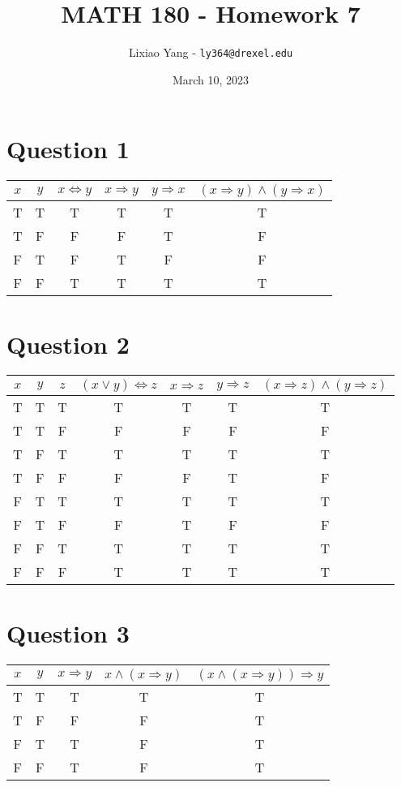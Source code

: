 \documentclass[11pt, oneside]{article}   	%
\title{\bf MATH 180 - Homework 7}
\author{Lixiao Yang - \texttt{ly364@drexel.edu}}
\date{March 10, 2023}							%
\begin{document}
\maketitle

\section*{Question 1}

	\begin{tabular}{cccccc}
	 \hline
	 $x$ & $y$ & $x\Leftrightarrow y$ & $x\Rightarrow y$ & $y\Rightarrow x$ & $(x\Rightarrow y)\wedge (y\Rightarrow x)$  \\
	 \hline
	 T & T & T & T & T & T \\
	 T & F & F & F & T & F \\
	 F & T & F & T & F & F \\
	 F & F & T & T & T & T \\
	 \hline
	\end{tabular}

\section*{Question 2}

	\begin{tabular}{ccccccc}
	 \hline
	 $x$ & $y$ & $z$ & $(x\vee y)\Leftrightarrow z$ & $x\Rightarrow z$ & $y\Rightarrow z$ & $(x\Rightarrow z)\wedge (y\Rightarrow z)$  \\
	 \hline
	 T & T & T & T & T & T & T \\
	 T & T & F & F & F & F & F \\
	 T & F & T & T & T & T & T \\
	 T & F & F & F & F & T & F \\
	 F & T & T & T & T & T & T \\
	 F & T & F & F & T & F & F \\
	 F & F & T & T & T & T & T \\
	 F & F & F & T & T & T & T \\
	 \hline
	\end{tabular}

\section*{Question 3}

\begin{tabular}{ccccc}
	\hline
	$x$ & $y$ & $x\Rightarrow y$ & $x\wedge (x\Rightarrow y)$ & $(x\wedge (x\Rightarrow y))\Rightarrow y$  \\
	\hline
	T & T & T & T & T \\
	T & F & F & F & T \\
	F & T & T & F & T \\
	F & F & T & F & T \\
	\hline
   \end{tabular} 
\end{document}
